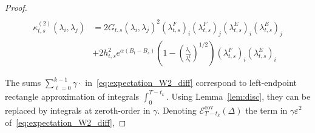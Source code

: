 \documentclass[11pt]{article}
\begin{document}
\begin{proof}
\begin{align}
\end{align}
\begin{equation} \label{eq:kappa2_diff}
\begin{split}
    \kappa^{(2)}_{t,s}(\lambda_i,\lambda_j) &= 2 G_{t,s}(\lambda_i,\lambda_j)^2 (\lambda^F_{t,s})_i (\lambda^F_{t,s})_j (\lambda^E_{t,s})_i (\lambda^E_{t,s})_j \\ &+ 2 h_{t,s}^2  e^{\alpha(B_{t}- B_{s})} \left( 1 - \left( \frac{\lambda_i}{\lambda^t_i }\right)^{1/2}\right) (\lambda^F_{t,s})_i (\lambda^E_{t,s})_i
\end{split}
\end{equation}

The sums $\sum_{\ell=0}^{k-1} \gamma \cdot $ in~\eqref{eq:expectation_W2_diff} correspond to left-endpoint rectangle approximation of integrals $\int_0^{T-t_k}$. Using Lemma~\ref{lem:disc}, they can be replaced by integrals at zeroth-order in $\gamma$. Denoting $\mathcal{E}_{T-t_k}^{\text{cov}}(\Delta)$ the term in $\gamma \varepsilon^2$ of~\eqref{eq:expectation_W2_diff}, 

\end{proof}
\end{document}
